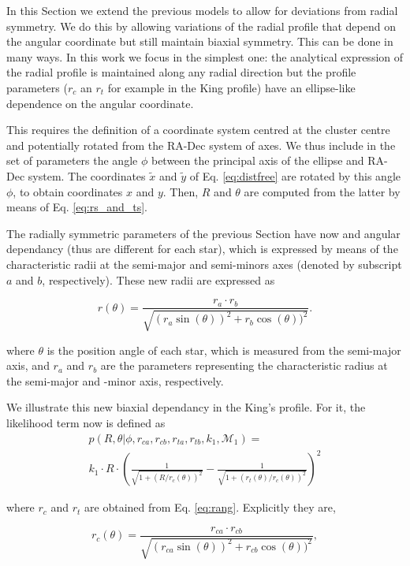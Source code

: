 In this Section we extend the previous models to allow for deviations
from radial symmetry. We do this by allowing variations of the radial
profile that depend on the angular coordinate but still maintain
biaxial symmetry. This can be done in many ways. In this work we focus
in the simplest one: the analytical expression of the radial profile
is maintained along any radial direction but the profile parameters
($r_c$ an $r_t$ for example in the King profile) have an ellipse-like
dependence on the angular coordinate.

This requires the definition of a coordinate system centred at the
cluster centre and potentially rotated from the RA-Dec system of
axes. We thus include in the set of parameters the angle $\phi$ between the principal axis of
the ellipse and RA-Dec system. The coordinates $\tilde{x}$ and $\tilde{y}$
of Eq. \ref{eq:distfree} are rotated by this angle $\phi$, to obtain coordinates $x$ and $y$. 
Then, $R$ and $\theta$ are computed from the latter by means of Eq. \ref{eq:rs_and_ts}.

The radially symmetric parameters of the previous Section have now and angular dependancy (thus are different for each star),
which is expressed by means of the characteristic radii at the semi-major and semi-minors axes (denoted by subscript $a$ and $b$, respectively).
These new radii are expressed as

\begin{equation}
r(\theta) = \frac{r_{a}\cdot r_{b}}{\sqrt{(r_{a}\sin(\theta))^2+r_{b}\cos(\theta))^2}}.
\label{eq:rang}
\end{equation}

where $\theta$ is the position angle of each star, which is measured from the semi-major axis, and $r_a$ and $r_b$ are the parameters
representing the characteristic radius at the semi-major and -minor axis, respectively.

We illustrate this new biaxial dependancy in the King's profile. 
For it, the likelihood term now is defined as
\begin{multline}
  p(R,\theta|\phi,r_{ca},r_{cb}, r_{ta},r_{tb}, k_1,\mathcal{M}_1)=\\
  k_1\cdot R \cdot
  \left(\frac{1}{\sqrt{1+({R}/{r_c(\theta)})^2}} - \frac{1}{\sqrt{1+({r_t(\theta)}/{r_c(\theta)})^2}}\right)^2
\label{eq:KingEll}
\end{multline}

where $r_c$ and $r_t$ are obtained from Eq. \ref{eq:rang}. Explicitly they are,

\begin{equation}
r_c(\theta) = \frac{r_{ca}\cdot r_{cb}}{\sqrt{(r_{ca}\sin(\theta))^2+r_{cb}\cos(\theta))^2}},
\label{eq:anglerc}
\end{equation}

